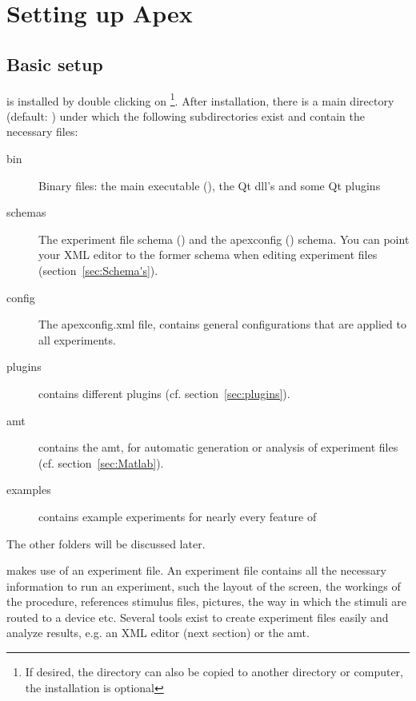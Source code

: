 \chapter{Setting up Apex}

\section{Basic setup}

\apex is installed by double clicking on
 \footnote{If desired, the \apex
directory can also be copied to another directory or computer, the
installation is optional}. After installation, there is a main
\apex directory (default: ) under
which the following subdirectories exist and contain the necessary
files:

\begin{description}
\item[bin] Binary files: the main \apex executable (),
the Qt dll's and some Qt plugins

\item[schemas] The experiment
file schema () and the apexconfig () schema. You can point your XML editor to the former schema when editing experiment files
(section~\ref{sec:Schema's}).

\item[config] The apexconfig.xml
file, contains general \apex configurations that are applied to all experiments.

\item[plugins] contains different plugins (cf.
section~\ref{sec:plugins}).

\item[amt] contains the \ac{amt}, for automatic generation or
analysis of experiment files (cf. section~\ref{sec:Matlab}).

\item[examples] contains example experiments for nearly every feature of \apex
\end{description}

The other folders will be discussed later.


\apex makes use of an experiment file. An experiment file contains
all the necessary information to run an experiment, such the layout of the screen, the workings of the procedure, references stimulus files, pictures, the way in which the stimuli are routed to a device etc. Several tools exist to create experiment files
easily and analyze results, e.g. an XML editor (next section) or the \ac{amt}.

